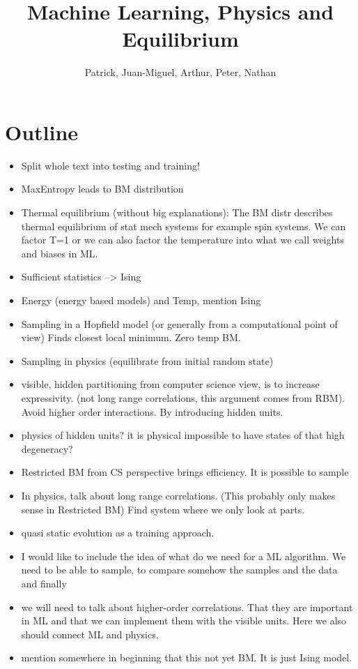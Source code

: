 \documentclass[nofootinbib, superscriptaddress, prl]{revtex4}
\begin{document}
\title{Machine Learning, Physics and Equilibrium}
\author{Patrick, Juan-Miguel, Arthur, Peter, Nathan}
\maketitle

\section{Outline}

\begin{itemize}
\item Split whole text into testing and training!
\item MaxEntropy leads to BM distribution
\item Thermal equilibrium (without big explanations): The BM distr describes thermal equilibrium of stat mech systems for example spin systems.
We can factor T=1 or we can also factor the temperature into what we call weights and biases in ML.
\item Sufficient statistics --> Ising
\item Energy (energy based models) and Temp, mention Ising
\item Sampling in a Hopfield model (or generally from a computational point of view) Finds closest local minimum. Zero temp BM.
\item Sampling in physics (equilibrate from initial random state)
\item visible, hidden partitioning from computer science view, is to increase expressivity.
(not long range correlations, this argument comes from RBM). Avoid higher order interactions. By introducing hidden units.
\item physics of hidden units? it is physical impossible to have states of that high degeneracy?
\item Restricted BM from CS perspective brings efficiency. It is possible to sample
\item In physics, talk about long range correlations. (This probably only makes sense in Restricted BM)
Find system where we only look at parts.
\item quasi static evolution as a training approach.
\item I would like to include the idea of what do we need for a ML algorithm. We need to be able to sample, to compare somehow the samples and the data and finally 
\item we will need to talk about higher-order correlations. That they are important in ML and that we can implement them with the visible units. Here we also should connect ML and physics.
\item mention somewhere in beginning that this not yet BM. It is just Ising model.
\end{itemize}
\end{document}
